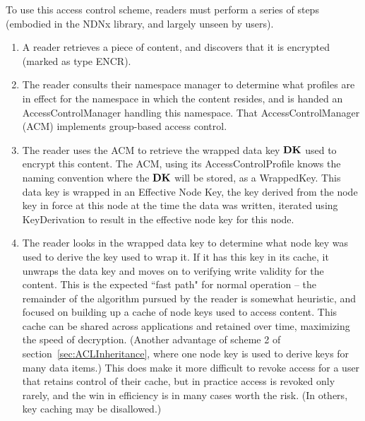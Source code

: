 To use this access control scheme, readers must perform a series of
steps (embodied in the NDNx library, and largely unseen by users).
\begin{enumerate}
\item A reader retrieves a piece of content, and discovers that it is encrypted (marked as type ENCR).

\item The reader consults their namespace manager to determine what
  profiles are in effect for the namespace in which the content
  resides, and is handed an AccessControlManager handling this
  namespace. That AccessControlManager (ACM) implements group-based
  access control.

\item The reader uses the ACM to retrieve the wrapped data key ${\textbf{DK}}$
  used to encrypt this content. The ACM, using its
  AccessControlProfile knows the naming convention where the ${\textbf{DK}}$
  will be stored, as a WrappedKey. This data key is wrapped in an
  Effective Node Key, the key derived from the node key in force at
  this node at the time the data was written, iterated using
  KeyDerivation to result in the effective node key for this node.

\item The reader looks in the wrapped data key to determine what node
  key was used to derive the key used to wrap it. If it has this key
  in its cache, it unwraps the data key and moves on to verifying
  write validity for the content. This is the expected ``fast path"
  for normal operation -- the remainder of the algorithm pursued by
  the reader is somewhat heuristic, and focused on building up a cache
  of node keys used to access content. This cache can be shared across
  applications and retained over time, maximizing the speed of
  decryption. (Another advantage of scheme 2 of
  section~\ref{sec:ACLInheritance}, where one node key is used to
  derive keys for many data items.) This does make it more difficult
  to revoke access for a user that retains control of their cache, but
  in practice access is revoked only rarely, and the win in efficiency
  is in many cases worth the risk. (In others, key caching may be
  disallowed.)


\end{enumerate}
